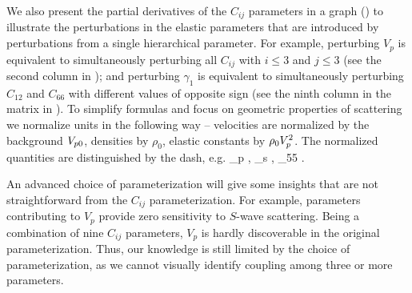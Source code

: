\eeq
%
We also present the partial derivatives of the $C_{ij}$ parameters in a graph () to illustrate the perturbations in the elastic parameters that are introduced by perturbations from a single hierarchical parameter. For example, perturbing $V_p$ is equivalent to simultaneously perturbing all $C_{ij}$ with $i \leq 3$ and $j \leq 3$ (see the second column in ); and perturbing $\gamma_1$ is equivalent to simultaneously perturbing $C_{12}$ and $C_{66}$ with different values of opposite sign (see the ninth column in the matrix in ). To simplify formulas and focus on geometric properties of scattering we normalize units in the following way -- velocities are normalized by the background $V_{p0}$, densities by $\rho_0$, elastic constants by $\rho_0 V_p^2$. The normalized quantities are distinguished by the dash, e.g.
\beq
\nmz{\v}_p \equiv {}, 
\nmz{\v}_s \equiv {},
_{55} \equiv {}. 
\eeq  



An advanced choice of parameterization will give some insights that are not straightforward from the $C_{ij}$ parameterization. For example, parameters contributing to $V_p$ provide zero sensitivity to $S$-wave scattering. Being a combination of nine $C_{ij}$ parameters, $V_p$ is hardly discoverable in the original parameterization. Thus, our knowledge is still limited by the choice of parameterization, as we cannot visually identify coupling among three or more parameters.
